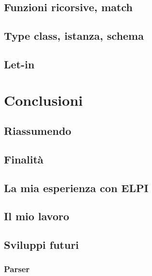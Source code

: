 \documentclass[12pt,a4paper,openright,twoside]{report}
\begin{document}
\section{Funzioni ricorsive, match}

\section{Type class, istanza, schema}

\section{Let-in}

\clearpage{\pagestyle{empty}\cleardoublepage}		%


\chapter{Conclusioni}		%



\section{Riassumendo}

\section{Finalità}

\section{La mia esperienza con ELPI}

\section{Il mio lavoro}

\section{Sviluppi futuri}
\subsection{Parser}
\end{document}
